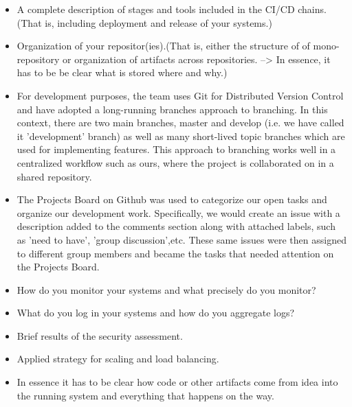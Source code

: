   
  \begin{itemize}
  \item A complete description of stages and tools included in the CI/CD chains.(That is, including deployment and release of your systems.)
  \item Organization of your repositor(ies).(That is, either the structure of of mono-repository or organization of artifacts across repositories. --> In essence, it has to be be clear what is stored where and why.) 
  \item For development purposes, the team uses Git for Distributed Version Control and have adopted a long-running branches approach to branching. In this context, there are two main branches, master and develop 
  (i.e. we have called it 'development' branch) as well as many short-lived topic branches which are used for implementing features. This approach to branching works well in a centralized workflow such as ours, where the project is collaborated on in a shared
  repository.
  \item The Projects Board on Github was used to categorize our open tasks and organize our development work. Specifically, we would create an issue with a description added to the comments section along
  with attached labels, such as 'need to have', 'group discussion',etc. These same issues were then assigned to different group members and became the tasks that needed attention on the Projects Board.
  
  \item How do you monitor your systems and what precisely do you monitor?
  \item What do you log in your systems and how do you aggregate logs?
  \item Brief results of the security assessment.
  \item Applied strategy for scaling and load balancing.
  \item In essence it has to be clear how code or other artifacts come from idea into the running system and everything that happens on the way.
  
\end{itemize}